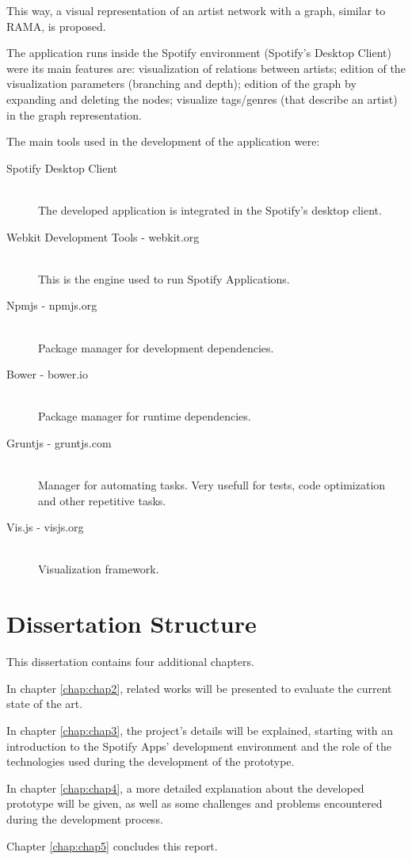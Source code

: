   This way, a visual representation of an artist network with a graph, similar to RAMA, is proposed.

  The application runs inside the Spotify environment (Spotify's Desktop Client) were its main features are: visualization of relations between artists; edition of the visualization parameters (branching and depth); edition of the graph by expanding and deleting the nodes; visualize tags/genres (that describe an artist) in the graph representation.

  The main tools used in the development of the application were:

  \begin{description}
    \item[Spotify Desktop Client] \hfill \\
      The developed application is integrated in the Spotify's desktop client.
    \item[Webkit Development Tools - webkit.org] \hfill \\
      This is the engine used to run Spotify Applications.
    \item[Npmjs - npmjs.org] \hfill \\
      Package manager for development dependencies.
    \item[Bower - bower.io] \hfill \\
      Package manager for runtime dependencies.
    \item[Gruntjs - gruntjs.com] \hfill \\
      Manager for automating tasks. Very usefull for tests, code optimization and other repetitive tasks.
    \item[Vis.js - visjs.org] \hfill \\
      Visualization framework.
  \end{description}


\section{Dissertation Structure} \label{sec:struct}

  This dissertation contains four additional chapters.

  In chapter \ref{chap:chap2}, related works will be presented to evaluate the current state of the art.

  In chapter \ref{chap:chap3}, the project's details will be explained, starting with an introduction to the Spotify Apps' development environment and the role of the technologies used during the development of the prototype.

  In chapter \ref{chap:chap4}, a more detailed explanation about the developed prototype will be given, as well as some challenges and problems encountered during the development process.

  Chapter \ref{chap:chap5} concludes this report.
